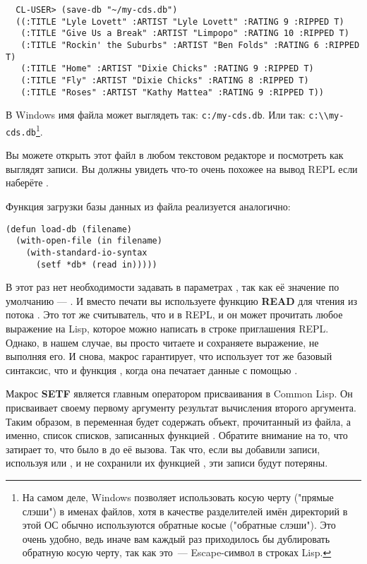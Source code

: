 \begin{verbatim}
  CL-USER> (save-db "~/my-cds.db")
  ((:TITLE "Lyle Lovett" :ARTIST "Lyle Lovett" :RATING 9 :RIPPED T)
   (:TITLE "Give Us a Break" :ARTIST "Limpopo" :RATING 10 :RIPPED T)
   (:TITLE "Rockin' the Suburbs" :ARTIST "Ben Folds" :RATING 6 :RIPPED T)
   (:TITLE "Home" :ARTIST "Dixie Chicks" :RATING 9 :RIPPED T)
   (:TITLE "Fly" :ARTIST "Dixie Chicks" :RATING 8 :RIPPED T)
   (:TITLE "Roses" :ARTIST "Kathy Mattea" :RATING 9 :RIPPED T))
\end{verbatim}

В Windows имя файла может выглядеть так: \lstinline!c:/my-cds.db!. Или так:
\lstinline!c:\\my-cds.db!\footnote{На самом деле, Windows позволяет использовать косую
  черту ("прямые слэши") в именах файлов, хотя в качестве разделителей имён директорий в
  этой ОС обычно используются обратные косые ("обратные слэши"). Это очень удобно, ведь
  иначе вам каждый раз приходилось бы дублировать обратную косую черту, так как это~---
  Escape-символ в строках Lisp.}.

Вы можете открыть этот файл в любом текстовом редакторе и посмотреть как выглядят
записи. Вы должны увидеть что-то очень похожее на вывод REPL если наберёте .

Функция загрузки базы данных из файла реализуется аналогично:

\begin{lstlisting}
(defun load-db (filename)
  (with-open-file (in filename)
    (with-standard-io-syntax
      (setf *db* (read in)))))
\end{lstlisting}

В этот раз нет необходимости задавать  в параметрах
, так как её значение по умолчанию --- . И вместо печати
вы используете функцию \textbf{READ} для чтения из потока . Это тот же
считыватель, что и в REPL, и он может прочитать любое выражение на Lisp, которое можно
написать в строке приглашения REPL. Однако, в нашем случае, вы просто читаете и сохраняете
выражение, не выполняя его. И снова, макрос  гарантирует,
что  использует тот же базовый синтаксис, что и функция , когда
она печатает данные с помощью .

Макрос \textbf{SETF} является главным оператором присваивания в Common Lisp. Он
присваивает своему первому аргументу результат вычисления второго аргумента. Таким образом,
в  переменная  будет содержать объект, прочитанный из файла, а
именно, список списков, записанных функцией . Обратите внимание на то, что
 затирает то, что было в  до её вызова. Так что, если вы добавили
записи, используя  или , и не сохранили их функцией
, эти записи будут потеряны.

